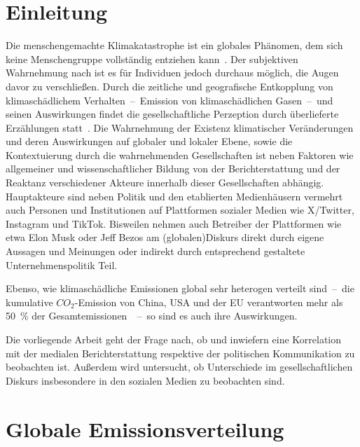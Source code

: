 \section{Einleitung}

Die menschengemachte Klimakatastrophe ist ein globales Phänomen, dem sich keine Menschengruppe vollständig entziehen kann~\cite{Book.Calvin.IPCCClimateChange2023SynthesisReport.2023}.
Der subjektiven Wahrnehmung nach ist es für Individuen jedoch durchaus möglich, die Augen davor zu verschließen.
Durch die zeitliche und geografische Entkopplung von klimaschädlichem Verhalten~--~Emission von klimaschädlichen Gasen~--~und seinen Auswirkungen findet die gesellschaftliche Perzeption durch überlieferte Erzählungen statt~\cite{Article.Moser.CommunicatingClimateChangeHistoryChallengesProcessAndFutureDirections.2009}. %
Die Wahrnehmung der Existenz klimatischer Veränderungen und deren Auswirkungen auf globaler und lokaler Ebene, sowie die Kontextuierung durch die wahrnehmenden Gesellschaften ist neben Faktoren wie allgemeiner und wissenschaftlicher Bildung von der Berichterstattung und der Reaktanz verschiedener Akteure innerhalb dieser Gesellschaften abhängig.
Hauptakteure sind neben Politik und den etablierten Medienhäusern vermehrt auch Personen und Institutionen auf Plattformen sozialer Medien wie X/Twitter, Instagram und TikTok.
Bisweilen nehmen auch Betreiber der Plattformen wie etwa Elon Musk oder Jeff Bezos am (globalen)Diskurs direkt durch eigene Aussagen und Meinungen oder indirekt durch entsprechend gestaltete Unternehmenspolitik Teil.\par\medskip

Ebenso, wie klimaschädliche Emissionen global sehr heterogen verteilt sind~--~die kumulative \(CO_2\)-Emission von China, USA und der EU verantworten mehr als \qty{50}{\percent} der Gesamtemissionen~\cite{Misc.Centre.GHGEmissionsOfAllWorldCountries.2023}~--~so sind es auch ihre Auswirkungen.\par
Die vorliegende Arbeit geht der Frage nach, ob und inwiefern eine Korrelation mit der medialen Berichterstattung respektive der politischen Kommunikation zu beobachten ist.
Außerdem wird untersucht, ob Unterschiede im gesellschaftlichen Diskurs insbesondere in den sozialen Medien zu beobachten sind.

\section{Globale Emissionsverteilung}

